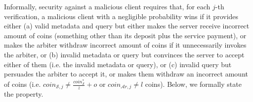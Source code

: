  
 
 
 
Informally, security against a malicious client requires that, for each  $j$-th verification, a malicious client with a negligible probability  wins if it provides either (a) valid metadata and query but either makes the server receive incorrect amount of coins (something other than its deposit plus the service payment), or makes the arbiter withdraw incorrect amount of coins if it unnecessarily invokes the arbiter,  or (b) invalid metadata or query but convinces the server to accept either of them (i.e. the invalid metadata or query), or (c) invalid query but persuades the arbiter to accept it, or  makes them withdraw an incorrect amount of coins (i.e. $coin_{\scriptscriptstyle\mathcal{S},j}\neq \frac{coin_{\scriptscriptstyle\mathcal S}^{\scriptscriptstyle*}}{z}+o$ or  $coin_{\scriptscriptstyle\mathcal{A}r,j}\neq l$ coins). Below, we formally state the property. 
 
 
